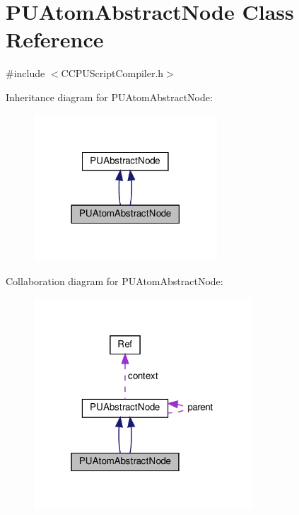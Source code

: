 \hypertarget{classPUAtomAbstractNode}{}\section{P\+U\+Atom\+Abstract\+Node Class Reference}
\label{classPUAtomAbstractNode}


{\ttfamily \#include $<$C\+C\+P\+U\+Script\+Compiler.\+h$>$}



Inheritance diagram for P\+U\+Atom\+Abstract\+Node\+:
\nopagebreak
\begin{figure}[H]
\begin{center}
\leavevmode
\includegraphics[width=194pt]{classPUAtomAbstractNode__inherit__graph}
\end{center}
\end{figure}


Collaboration diagram for P\+U\+Atom\+Abstract\+Node\+:
\nopagebreak
\begin{figure}[H]
\begin{center}
\leavevmode
\includegraphics[width=232pt]{classPUAtomAbstractNode__coll__graph}
\end{center}
\end{figure}
